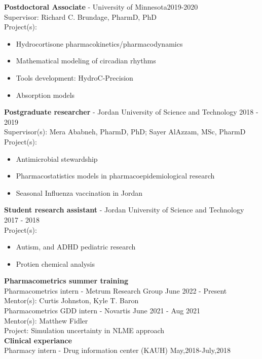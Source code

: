 \documentclass[a4paper,11pt]{article}
\begin{document}
\textbf{Postdoctoral Associate} - University of Minnesota\hfill 2019-2020\\
Supervisor: Richard C. Brundage, PharmD, PhD\\
Project(s):\\
\begin{itemize}
\item Hydrocortisone pharmacokinetics/pharmacodynamics
\item Mathematical modeling of circadian rhythms
\item Tools development: HydroC-Precision
\item Absorption models
\end{itemize}

\textbf{Postgraduate researcher} - Jordan University of Science and Technology \hfill 2018 - 2019\\
Supervisor(s): Mera Ababneh, PharmD, PhD; Sayer AlAzzam, MSc, PharmD \\
Project(s):
\begin{itemize}
\item Antimicrobial stewardship
\item Pharmacostatistics models in pharmacoepidemiological research
\item Seasonal Influenza vaccination in Jordan
\end{itemize}

\textbf{Student research assistant} - Jordan University of Science and Technology \hfill 2017 - 2018\\
Project(s):
\begin{itemize}
\item Autism, and ADHD pediatric research
\item Protien chemical analysis
\end{itemize}

\textbf{Pharmacometrics summer training} \\
Pharmacometrics intern - Metrum Research Group \hfill June 2022 - Present \\
Mentor(s): Curtis Johnston, Kyle T. Baron \\[1cm]
Pharmacometrics GDD intern - Novartis \hfill June 2021 - Aug 2021\\
Mentor(s): Matthew Fidler \\
Project: Simulation uncertainty in NLME approach \\
\textbf{Clinical experiance}\\

Pharmacy intern - Drug information center (KAUH) \hfill May,2018-July,2018 \\
\end{document}
